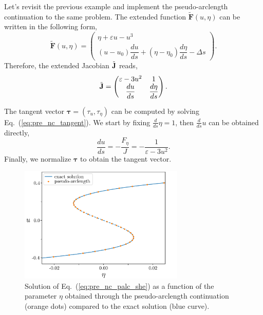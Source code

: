 \begin{exmp}
    Let's revisit the previous example and implement the pseudo-arclength continuation
    to the same problem. The extended function $\tilde{\bm{F}}(u, {\eta})$ can be written
    in the following form,
    \begin{equation}
        \tilde{\bm{F}}(u, \eta) = 
            \begin{pmatrix}
                \eta + \varepsilon u - u^3 \\
                \left(u - u_0\right) \dfrac{du}{ds} + (\eta - \eta_0) \dfrac{d\eta}{ds} - \Delta s
            \end{pmatrix}.
            \label{eq:pre_nc_palc_she}
    \end{equation}
    Therefore, the extended Jacobian $\tilde{\mathbf{J}}$ reads,
    \begin{equation*}
        \tilde{\mathbf{J}} = \begin{pmatrix}
                \varepsilon - 3u^2 & 1 \\
                \dfrac{du}{ds} & \dfrac{d\eta}{ds}
            \end{pmatrix}.
    \end{equation*}

    The tangent vector $\bm{\tau} = (\tau_u, \tau_{\eta})$ can be computed by solving Eq.~(\ref{eq:pre_nc_tangent}).
    We start by fixing $\frac{d}{ds}\eta = 1$, then $\frac{d}{ds}u$ can be obtained directly,
    \begin{equation*}
        \dfrac{du}{ds} = -\dfrac{F_{\eta}}{J} = -\dfrac{1}{\varepsilon - 3u^2}.
    \end{equation*}
    Finally, we normalize $\bm{\tau}$ to obtain the tangent vector.

    \begin{figure}[h]
        \centering
        \includegraphics[width=0.7\textwidth]{scripts/figures/palc_she.png}
        \caption[short]{Solution of Eq.~(\ref{eq:pre_nc_palc_she}) as a function of the parameter $\eta$ obtained
        through the pseudo-arclength continuation (orange dots) compared to the exact solution (blue curve).}
        \label{fig:pre_nc_she}
    \end{figure}

\end{exmp}

